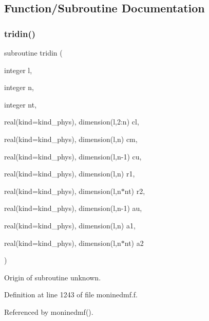 \subsection{Function/\+Subroutine Documentation}
\mbox{\label{moninedmf_8f_ab77885fe7ace4ef00558157788778408}} 
\subsubsection{\texorpdfstring{tridin()}{tridin()}}
{\footnotesize\ttfamily subroutine tridin (\begin{DoxyParamCaption}\item[{integer}]{l,  }\item[{integer}]{n,  }\item[{integer}]{nt,  }\item[{real(kind=kind\+\_\+phys), dimension(l,2\+:n)}]{cl,  }\item[{real(kind=kind\+\_\+phys), dimension(l,n)}]{cm,  }\item[{real(kind=kind\+\_\+phys), dimension(l,n-\/1)}]{cu,  }\item[{real(kind=kind\+\_\+phys), dimension(l,n)}]{r1,  }\item[{real(kind=kind\+\_\+phys), dimension(l,n$\ast$nt)}]{r2,  }\item[{real(kind=kind\+\_\+phys), dimension(l,n-\/1)}]{au,  }\item[{real(kind=kind\+\_\+phys), dimension(l,n)}]{a1,  }\item[{real(kind=kind\+\_\+phys), dimension(l,n$\ast$nt)}]{a2 }\end{DoxyParamCaption})}

Origin of subroutine unknown. 

Definition at line 1243 of file moninedmf.\+f.



Referenced by moninedmf().

